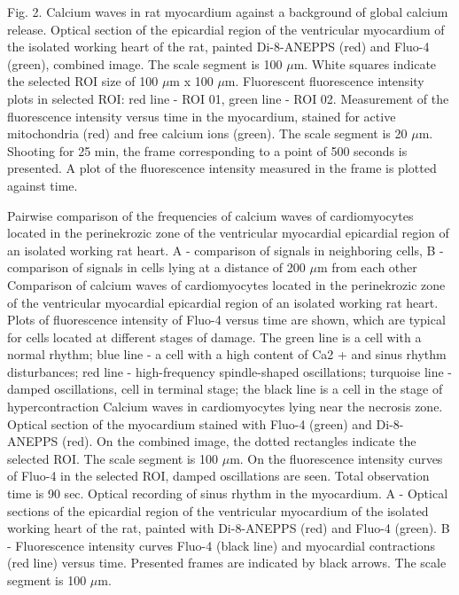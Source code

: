 \documentclass{biophys-new}
\begin{document}
Fig. 2.  Calcium waves in rat myocardium against a background of global calcium release.
Optical section of the epicardial region of the ventricular myocardium of the isolated working heart of the rat, painted Di-8-ANEPPS (red) and Fluo-4 (green), combined image.
The scale segment is 100 $\mu$m.
White squares indicate the selected ROI size of 100 $\mu$m x 100 $\mu$m.
Fluorescent fluorescence intensity plots in selected ROI: red line - ROI 01, green line - ROI 02.
Measurement of the fluorescence intensity versus time in the myocardium, stained for active mitochondria (red) and free calcium ions (green).
The scale segment is 20 $\mu$m. Shooting for 25 min, the frame corresponding to a point of 500 seconds is presented.
A plot of the fluorescence intensity measured in the frame is plotted against time.


Pairwise comparison of the frequencies of calcium waves of cardiomyocytes located in the perinekrozic zone of the ventricular myocardial epicardial region of an isolated working rat heart. A - comparison of signals in neighboring cells, B - comparison of signals in cells lying at a distance of 200 $\mu$m from each other
Comparison of calcium waves of cardiomyocytes located in the perinekrozic zone of the ventricular myocardial epicardial region of an isolated working rat heart. Plots of fluorescence intensity of Fluo-4 versus time are shown, which are typical for cells located at different stages of damage. The green line is a cell with a normal rhythm; blue line - a cell with a high content of Ca2 + and sinus rhythm disturbances; red line - high-frequency spindle-shaped oscillations; turquoise line - damped oscillations, cell in terminal stage; the black line is a cell in the stage of hypercontraction
Calcium waves in cardiomyocytes lying near the necrosis zone. Optical section of the myocardium stained with Fluo-4 (green) and Di-8-ANEPPS (red). On the combined image, the dotted rectangles indicate the selected ROI. The scale segment is 100 $\mu$m. On the fluorescence intensity curves of Fluo-4 in the selected ROI, damped oscillations are seen. Total observation time is 90 sec.
Optical recording of sinus rhythm in the myocardium. A - Optical sections of the epicardial region of the ventricular myocardium of the isolated working heart of the rat, painted with Di-8-ANEPPS (red) and Fluo-4 (green). B - Fluorescence intensity curves Fluo-4 (black line) and myocardial contractions (red line) versus time. Presented frames are indicated by black arrows. The scale segment is 100 $\mu$m.
\end{document}
